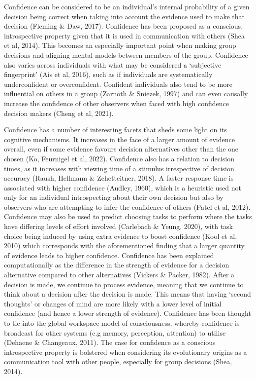 \documentclass[a4paper, nobind]{templates/ociamthesis}
\begin{document}
Confidence can be considered to be an individual's internal probability of a given decision being correct when taking into account the evidence used to make that decision (Fleming \& Daw, 2017). Confidence has been proposed as a conscious, introspective property given that it is used in communication with others (Shea et al, 2014). This becomes an especially important point when making group decisions and aligning mental models between members of the group. Confidence also varies across individuals with what may be considered a `subjective fingerprint' (Ais et al, 2016), such as if individuals are systematically underconfident or overconfident. Confident individuals also tend to be more influential on others in a group (Zarnoth \& Sniezek, 1997) and can even causally increase the confidence of other observers when faced with high confidence decision makers (Cheng et al, 2021).

Confidence has a number of interesting facets that sheds some light on its cognitive mechanisms. It increases in the face of a larger amount of evidence overall, even if some evidence favours decision alternatives other than the one chosen (Ko, Feurnigel et al, 2022). Confidence also has a relation to decision times, as it increases with viewing time of a stimulus irrespective of decision accuracy (Raush, Hellmann \& Zehetteitner, 2018). A faster response time is associated with higher confidence (Audley, 1960), which is a heuristic used not only for an individual introspecting about their own decision but also by observers who are attempting to infer the confidence of others (Patel et al, 2012). Confidence may also be used to predict choosing tasks to perform where the tasks have differing levels of effort involved (Carlebach \& Yeung, 2020), with task choice being induced by using extra evidence to boost confidence (Kool et al, 2010) which corresponds with the aforementioned finding that a larger quantity of evidence leads to higher confidence. Confidence has been explained computationally as the difference in the strength of evidence for a decision alternative compared to other alternatives (Vickers \& Packer, 1982). After a decision is made, we continue to process evidence, meaning that we continue to think about a decision after the decision is made. This means that having `second thoughts' or changes of mind are more likely with a lower level of initial confidence (and hence a lower strength of evidence). Confidence has been thought to tie into the global workspace model of consciousness, whereby confidence is broadcast for other systems (e.g memory, perception, attention) to utilise (Dehaene \& Changeaux, 2011). The case for confidence as a conscious introspective property is bolstered when considering its evolutionary origins as a communication tool with other people, especially for group decisions (Shea, 2014).
\end{document}
